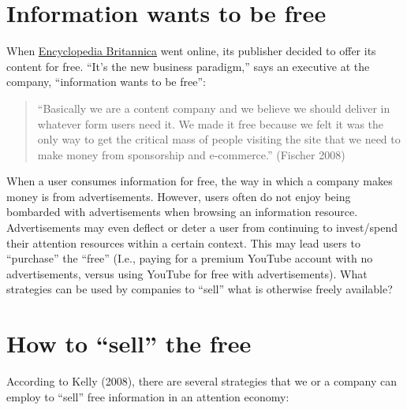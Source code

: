 \documentclass[
  letterpaper,
  DIV=11,
  numbers=noendperiod]{scrreprt}
\begin{document}
\section{Information wants to be
free}\label{information-wants-to-be-free}

When \href{https://www.britannica.com/}{Encyclopedia Britannica} went
online, its publisher decided to offer its content for free. ``It's the
new business paradigm,'' says an executive at the company, ``information
wants to be free'':~

\begin{quote}
``Basically we are a content company and we believe we should deliver in
whatever form users need it. We made it free because we felt it was the
only way to get the critical mass of people visiting the site that we
need to make money from sponsorship and e-commerce.'' (Fischer 2008)
\end{quote}

When a user consumes information for free, the way in which a company
makes money is from advertisements. However, users often do not enjoy
being bombarded with advertisements when browsing an information
resource. Advertisements may even deflect or deter a user from
continuing to invest/spend their attention resources within a certain
context. This may lead users to ``purchase'' the ``free'' (I.e., paying
for a premium YouTube account with no advertisements, versus using
YouTube for free with advertisements). What strategies can be used by
companies to ``sell'' what is otherwise freely available?

\section{How to ``sell'' the free}\label{how-to-sell-the-free}

According to Kelly (2008), there are several strategies that we or a
company can employ to ``sell'' free information in an attention
economy:~~
\end{document}
